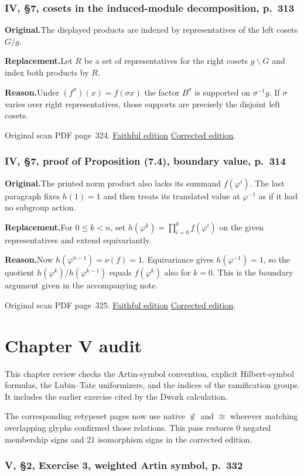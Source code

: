 \documentclass[11pt,a4paper]{article}
\newcommand{\original}{\par\smallskip\noindent\textbf{Original.}\enspace}
\newcommand{\replacement}{\par\smallskip\noindent\textbf{Replacement.}\enspace}
\newcommand{\reason}{\par\smallskip\noindent\textbf{Reason.}\enspace}
\newcommand{\editionlink}[3]{\href{#1\#errata.#2}{#3}}
\newcommand{\location}[2]{%
  \par\smallskip\noindent Original scan PDF page~#2.\enspace
  \editionlink{Neukirch_Faithful.pdf}{#1}{Faithful edition}
  \quad\editionlink{Neukirch_Corrected.pdf}{#1}{Corrected edition}.}
\begin{document}
\setcounter{section}{113}
\section{IV, \S7, cosets in the induced-module decomposition, p.~313}\label{errata:item:114}

\original The displayed products are indexed by representatives of the left cosets $G/g$.
\replacement Let $R$ be a set of representatives for the right cosets $g\backslash G$ and index both products by $R$.
\reason Under $(f^\sigma)(x)=f(\sigma x)$ the factor $B^\sigma$ is supported on $\sigma^{-1}g$. If $\sigma$ varies over right representatives, those supports are precisely the disjoint left cosets.
\location{114}{324}

\setcounter{section}{114}
\section{IV, \S7, proof of Proposition (7.4), boundary value, p.~314}\label{errata:item:115}

\original The printed norm product also lacks its summand $f(\varphi^i)$. The last paragraph fixes $h(1)=1$ and then treats its translated value at $\varphi^{-1}$ as if it had no subgroup action.
\replacement For $0\le k<n$, set $h(\varphi^k)=\prod_{i=0}^k f(\varphi^i)$ on the given representatives and extend equivariantly.
\reason Now $h(\varphi^{n-1})=\nu(f)=1$. Equivariance gives $h(\varphi^{-1})=1$, so the quotient $h(\varphi^k)/h(\varphi^{k-1})$ equals $f(\varphi^k)$ also for $k=0$. This is the boundary argument given in the accompanying note.
\location{115}{325}


\clearpage
\part{Chapter V audit}
This chapter review checks the Artin-symbol convention, explicit Hilbert-symbol formulas, the Lubin--Tate uniformizers, and the indices of the ramification groups. It includes the earlier exercise cited by the Dwork calculation.\par The corresponding retypeset pages now use native \(\notin\) and \(\cong\) wherever matching overlapping glyphs confirmed those relations. This pass restores 0 negated membership signs and 21 isomorphism signs in the corrected edition.
\setcounter{section}{115}
\section{V, \S2, Exercise 3, weighted Artin symbol, p.~332}\label{errata:item:116}
\end{document}

